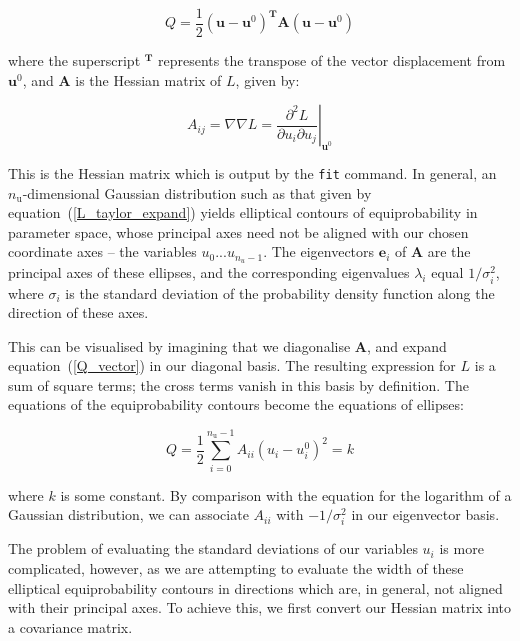 \documentclass[a4paper,onecolumn,11pt]{book}
\begin{document}
\begin{equation}
Q = \frac{1}{2} \left(\mathbf{u} - \mathbf{u}^0\right)^\mathbf{T} \mathbf{A} \left(\mathbf{u} - \mathbf{u}^0\right)
\label{Q_vector}
\end{equation}

\noindent where the superscript $^\mathbf{T}$ represents the transpose of the
vector displacement from $\mathbf{u}^0$, and $\mathbf{A}$ is the Hessian matrix
of $L$, given by:

\begin{equation}
A_{ij} = \nabla\nabla L = \left.\frac{\partial^2 L}{\partial u_i \partial u_j}\right|_{\mathbf{u}^0}
\end{equation}

This is the Hessian matrix which is output by the \texttt{fit} command. In
general, an $n_\mathrm{u}$-dimensional Gaussian distribution such as that given
by equation~(\ref{L_taylor_expand}) yields elliptical contours of
equiprobability in parameter space, whose principal axes need not be aligned
with our chosen coordinate axes -- the variables $u_0 ... u_{n_u-1}$. The
eigenvectors $\mathbf{e}_i$ of $\mathbf{A}$ are the principal axes of these
ellipses, and the corresponding eigenvalues $\lambda_i$ equal $1/\sigma_i^2$,
where $\sigma_i$ is the standard deviation of the probability density function
along the direction of these axes.

This can be visualised by imagining that we diagonalise $\mathbf{A}$, and
expand equation~(\ref{Q_vector}) in our diagonal basis. The resulting
expression for $L$ is a sum of square terms; the cross terms vanish in this
basis by definition. The equations of the equiprobability contours become the
equations of ellipses:

\begin{equation}
Q = \frac{1}{2} \sum_{i=0}^{n_\mathrm{u}-1} A_{ii} \left(u_i - u^0_i\right)^2 = k
\end{equation}

\noindent where $k$ is some constant. By comparison with the equation for the
logarithm of a Gaussian distribution, we can associate $A_{ii}$ with
$-1/\sigma_i^2$ in our eigenvector basis.

The problem of evaluating the standard deviations of our variables $u_i$ is
more complicated, however, as we are attempting to evaluate the width of these
elliptical equiprobability contours in directions which are, in general, not
aligned with their principal axes. To achieve this, we first convert our
Hessian matrix into a covariance matrix.
\end{document}
